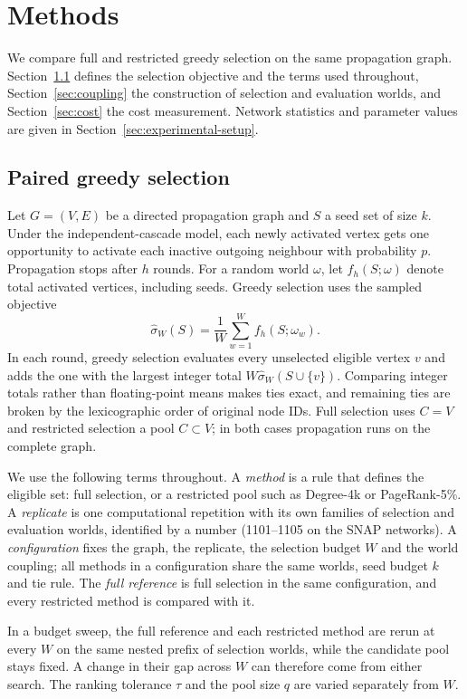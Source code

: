 \documentclass[smallextended]{svjour3}
\begin{document}
\section{Methods}
We compare full and restricted greedy selection on the same propagation graph. Section~\ref{sec:paired} defines the selection objective and the terms used throughout, Section~\ref{sec:coupling} the construction of selection and evaluation worlds, and Section~\ref{sec:cost} the cost measurement. Network statistics and parameter values are given in Section~\ref{sec:experimental-setup}.
\subsection{Paired greedy selection}\label{sec:paired}
Let $G=(V,E)$ be a directed propagation graph and $S$ a seed set of size $k$. Under the independent-cascade model, each newly activated vertex gets one opportunity to activate each inactive outgoing neighbour with probability $p$. Propagation stops after $h$ rounds. For a random world $\omega$, let $f_h(S;\omega)$ denote total activated vertices, including seeds. Greedy selection uses the sampled objective
\begin{equation}
\widehat\sigma_W(S)=\frac{1}{W}\sum_{w=1}^{W}f_h(S;\omega_w).
\end{equation}
In each round, greedy selection evaluates every unselected eligible vertex $v$ and adds the one with the largest integer total $W\widehat\sigma_W(S\cup\{v\})$. Comparing integer totals rather than floating-point means makes ties exact, and remaining ties are broken by the lexicographic order of original node IDs. Full selection uses $C=V$ and restricted selection a pool $C\subset V$; in both cases propagation runs on the complete graph.

We use the following terms throughout. A \emph{method} is a rule that defines the eligible set: full selection, or a restricted pool such as Degree-4k or PageRank-5\%. A \emph{replicate} is one computational repetition with its own families of selection and evaluation worlds, identified by a number (1101--1105 on the SNAP networks). A \emph{configuration} fixes the graph, the replicate, the selection budget $W$ and the world coupling; all methods in a configuration share the same worlds, seed budget $k$ and tie rule. The \emph{full reference} is full selection in the same configuration, and every restricted method is compared with it.

In a budget sweep, the full reference and each restricted method are rerun at every $W$ on the same nested prefix of selection worlds, while the candidate pool stays fixed. A change in their gap across $W$ can therefore come from either search. The ranking tolerance $\tau$ and the pool size $q$ are varied separately from $W$.
\end{document}
